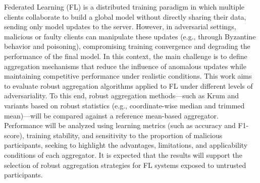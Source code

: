 
Federated Learning (FL) is a distributed training paradigm in which multiple clients collaborate to build a global model without directly sharing their data, sending only model updates to the server. However, in adversarial settings, malicious or faulty clients can manipulate these updates (e.g., through Byzantine behavior and poisoning), compromising training convergence and degrading the performance of the final model. In this context, the main challenge is to define aggregation mechanisms that reduce the influence of anomalous updates while maintaining competitive performance under realistic conditions. This work aims to evaluate robust aggregation algorithms applied to FL under different levels of adversariality. To this end, robust aggregation methods—such as Krum and variants based on robust statistics (e.g., coordinate-wise median and trimmed mean)—will be compared against a reference mean-based aggregator. Performance will be analyzed using learning metrics (such as accuracy and F1-score), training stability, and sensitivity to the proportion of malicious participants, seeking to highlight the advantages, limitations, and applicability conditions of each aggregator. It is expected that the results will support the selection of robust aggregation strategies for FL systems exposed to untrusted participants.





